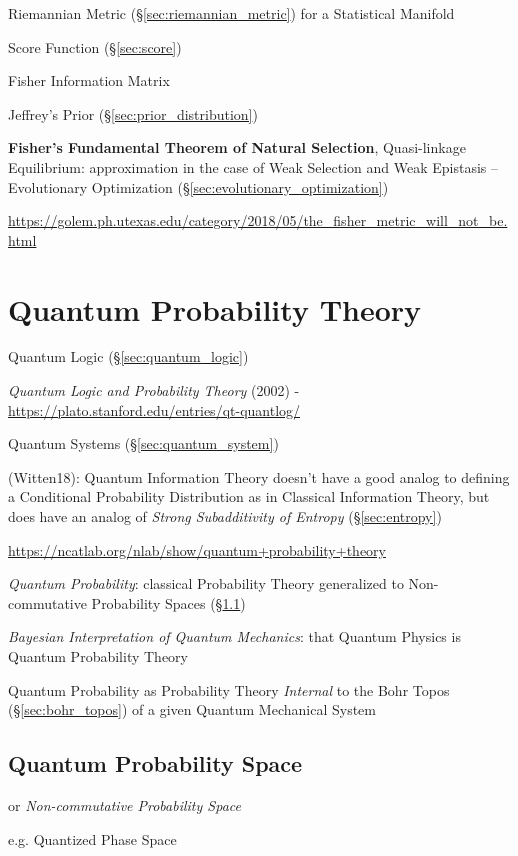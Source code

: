 Riemannian Metric (\S\ref{sec:riemannian_metric}) for a Statistical Manifold

Score Function (\S\ref{sec:score})

Fisher Information Matrix

Jeffrey's Prior (\S\ref{sec:prior_distribution})

\fist \textbf{Fisher's Fundamental Theorem of Natural Selection},
Quasi-linkage Equilibrium: approximation in the case of Weak Selection
and Weak Epistasis -- Evolutionary Optimization
(\S\ref{sec:evolutionary_optimization}) %

\url{https://golem.ph.utexas.edu/category/2018/05/the_fisher_metric_will_not_be.html}



\section{Quantum Probability Theory}\label{sec:quantum_probability}

Quantum Logic (\S\ref{sec:quantum_logic})

\emph{Quantum Logic and Probability Theory} (2002) -
\url{https://plato.stanford.edu/entries/qt-quantlog/}

Quantum Systems (\S\ref{sec:quantum_system})

(Witten18): Quantum Information Theory doesn't have a good analog to defining a
Conditional Probability Distribution as in Classical Information Theory, but
does have an analog of \emph{Strong Subadditivity of Entropy}
(\S\ref{sec:entropy})

\url{https://ncatlab.org/nlab/show/quantum+probability+theory}

\emph{Quantum Probability}: classical Probability Theory generalized to
Non-commutative Probability Spaces (\S\ref{sec:quantum_probability_space})

\emph{Bayesian Interpretation of Quantum Mechanics}: that Quantum Physics is
Quantum Probability Theory

Quantum Probability as Probability Theory \emph{Internal} to the Bohr Topos
(\S\ref{sec:bohr_topos}) of a given Quantum Mechanical System



\subsection{Quantum Probability Space}\label{sec:quantum_probability_space}

or \emph{Non-commutative Probability Space}

e.g. Quantized Phase Space
